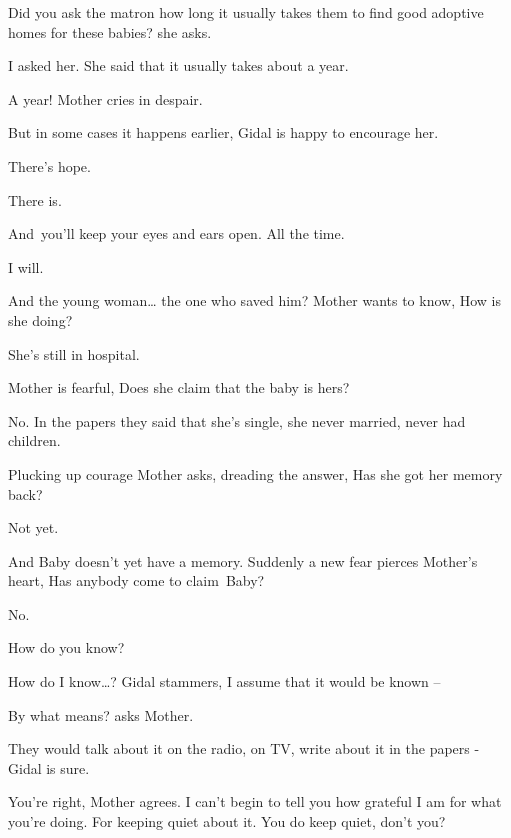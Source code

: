 \documentclass[12pt]{book}
\begin{document}
{\textquotedbl}Did you ask the matron how long it usually takes them to find good adoptive homes for these
babies?{\textquotedbl} she asks.

{\textquotedbl}I asked her. She said that it usually takes about a year.{\textquotedbl}

{\textquotedbl}A year!{\textquotedbl} Mother cries in despair.

{\textquotedbl}But in some cases it happens earlier,{\textquotedbl} Gidal is happy to encourage her.

{\textquotedbl}There's hope.{\textquotedbl}

{\textquotedbl}There is.{\textquotedbl}

{\textquotedbl}And~you'll keep your eyes and ears open. All the time.{\textquotedbl}

{\textquotedbl}I will.{\textquotedbl}

{\textquotedbl}And the young woman{\dots} the one who saved him?{\textquotedbl} Mother wants to know, {\textquotedbl}How
is she doing?{\textquotedbl}

{\textquotedbl}She's still in hospital.{\textquotedbl}

Mother is fearful, {\textquotedbl}Does she claim{ }that the baby is hers?{\textquotedbl}

{\textquotedbl}No. In the papers they said that she's single, she never married, never had children.{\textquotedbl}

Plucking up courage Mother asks, dreading the answer, {\textquotedbl}Has she got her memory back?{\textquotedbl}

{\textquotedbl}Not yet.{\textquotedbl}

{\textquotedbl}And Baby doesn't yet have a memory.{\textquotedbl} Suddenly a new fear pierces Mother's heart,
{\textquotedbl}Has anybody come to claim~Baby?{\textquotedbl}

{\textquotedbl}No.{\textquotedbl}

{\textquotedbl}How do you know?{\textquotedbl}

{\textquotedbl}How do I know{\dots}?{\textquotedbl} Gidal stammers, {\textquotedbl}I assume that it would be known
--{\textquotedbl}

{\textquotedbl}By what means?{\textquotedbl} asks Mother.

{\textquotedbl}They would talk about it on the radio, on TV, write about it in the papers -{\textquotedbl} Gidal is
sure.

{\textquotedbl}You're right,{\textquotedbl} Mother agrees. {\textquotedbl}I can't begin to tell you how grateful I am
for what you're doing. For keeping quiet about it. You do keep quiet, don't you?{\textquotedbl}
\end{document}
